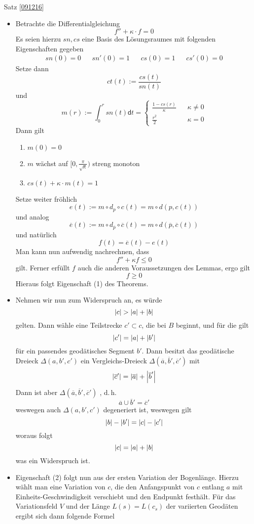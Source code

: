 \documentclass{book}
\renewcommand{\d}{\textsf{d}}
\renewcommand{\l}[1]{\overline{#1}}
\begin{document}
\begin{Beweis}{Satz \ref{091216}}
\begin{itemize}
\item Betrachte die Differentialgleichung
\[f'' + \kappa \cdot f = 0\]
Es seien hierzu $sn, cs$ eine Basis des Lösungsraumes mit folgenden Eigenschaften gegeben
\begin{align*}
sn(0) = 0 && sn'(0) = 1 && cs(0) = 1 && cs'(0) = 0
\end{align*}
Setze dann
\[ct(t) := \frac{cs(t)}{sn(t)}\]
und
\[ m(r) := \int_{0}^{r} sn(t)\d t = \left\lbrace
\begin{aligned}
\frac{1-cs(r)}{\kappa} && \kappa\neq 0\\
\frac{r^2}{2} && \kappa = 0
\end{aligned}
\right. \]
Dann gilt
\begin{enumerate}[1.)]
\item $m(0) = 0$
\item $m$ wächst auf $[0,\frac{\pi}{\sqrt{\kappa}})$ streng monoton
\item $cs(t) + \kappa \cdot m(t) = 1$
\end{enumerate}
Setze weiter fröhlich
\[ e(t) := m \circ d_p \circ c (t) = m\circ d(p, c(t)) \]
und analog
\[ \l e(t) := m \circ d_{\l p} \circ \l c (t) = m\circ d(\l p, \l c(t)) \]
und natürlich
\[f(t) = \l e(t) - e(t) \]
Man kann nun aufwendig nachrechnen, dass
\[ f'' +\kappa f \leq 0\]
gilt. Ferner erfüllt $f$ auch die anderen Voraussetzungen des Lemmas, ergo gilt
\[ f \geq 0\]
Hieraus folgt Eigenschaft (1) des Theorems.
\item Nehmen wir nun zum Widerspruch an, es würde
\[ \left|c\right| > \left|a\right| + \left|b\right| \]
gelten. Dann wähle eine Teilstrecke $c' \subset c$, die bei $B$ beginnt, und für die gilt
\[ \left|c'\right| = \left|a\right| + \left|b'\right| \]
für ein passendes geodätisches Segment $b'$. Dann besitzt das geodätische Dreieck $\Delta(a,b',c')$ ein Vergleichs-Dreieck $\Delta(\l a, \l b', \l c')$ mit
\[ \bet{\l c'} = \bet{\l a} + \bet{\l b'} \]
Dann ist aber $\Delta(\l a, \l b', \l c')$ , d.\,h.
\[ \l a \cup \l b' = \l c' \]
weswegen auch $\Delta(a,b',c')$ degeneriert ist, weswegen gilt
\[ \left|b\right| - \left|b'\right| = \left|c\right| - \left|c'\right|\]
woraus folgt
\[ \left|c\right| = \left|a\right| + \left|b\right| \]
was ein Widerspruch ist.
\item Eigenschaft (2) folgt nun aus der ersten Variation der Bogenlänge. Hierzu wählt man eine Variation von $c$, die den Anfangspunkt von $c$ entlang $a$ mit Einheits-Geschwindigkeit verschiebt und den Endpunkt festhält. Für das Variationsfeld $V$ und der Länge $L(s) = L(c_s)$ der variierten Geodäten ergibt sich dann folgende Formel

\end{itemize}
\end{Beweis}
\end{document}
